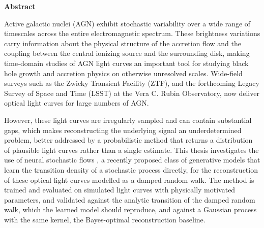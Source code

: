 \clearpage
\thispagestyle{plain}
\begin{center}
    \vspace{5.0cm}
    \textbf{\Large Abstract}
\end{center}
\vspace{1em}
Active galactic nuclei (AGN) exhibit stochastic variability over a wide range of timescales across the entire electromagnetic spectrum. These brightness variations carry information about the physical structure of the accretion flow and the coupling between the central ionizing source and the surrounding disk, making time-domain studies of AGN light curves an important tool for studying black hole growth and accretion physics on otherwise unresolved scales. Wide-field surveys such as the Zwicky Transient Facility (ZTF), and the forthcoming Legacy Survey of Space and Time (LSST) at the Vera C. Rubin Observatory, now deliver optical light curves for large numbers of AGN.

However, these light curves are irregularly sampled and can contain substantial gaps, which makes reconstructing the underlying signal an underdetermined problem, better addressed by a probabilistic method that returns a distribution of plausible light curves rather than a single estimate. This thesis investigates the use of neural stochastic flows \parencite{Kiyohara2025SNF}, a recently proposed class of generative models that learn the transition density of a stochastic process directly, for the reconstruction of these optical light curves modelled as a damped random walk. The method is trained and evaluated on simulated light curves with physically motivated parameters, and validated against the analytic transition of the damped random walk, which the learned model should reproduce, and against a Gaussian process with the same kernel, the Bayes-optimal reconstruction baseline.

